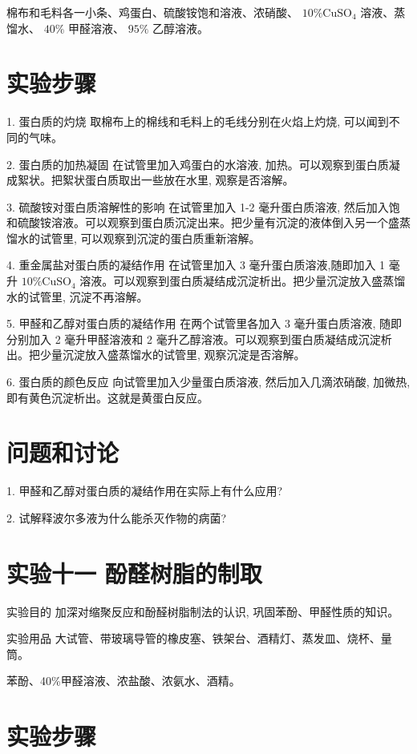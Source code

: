 \documentclass[10pt]{article}
\begin{document}
棉布和毛料各一小条、鸡蛋白、硫酸铵饱和溶液、浓硝酸、 \({10}\% {\mathrm{{CuSO}}}_{4}\) 溶液、蒸馏水、 \({40}\%\) 甲醛溶液、 \({95}\%\) 乙醇溶液。

\section*{实验步骤}

1. 蛋白质的灼烧 取棉布上的棉线和毛料上的毛线分别在火焰上灼烧, 可以闻到不同的气味。

2. 蛋白质的加热凝固 在试管里加入鸡蛋白的水溶液, 加热。可以观察到蛋白质凝成絮状。把絮状蛋白质取出一些放在水里, 观察是否溶解。

3. 硫酸铵对蛋白质溶解性的影响 在试管里加入 1-2 毫升蛋白质溶液, 然后加入饱和硫酸铵溶液。可以观察到蛋白质沉淀出来。把少量有沉淀的液体倒入另一个盛蒸馏水的试管里, 可以观察到沉淀的蛋白质重新溶解。

4. 重金属盐对蛋白质的凝结作用 在试管里加入 3 毫升蛋白质溶液,随即加入 1 毫升 \({10}\% {\mathrm{{CuSO}}}_{4}\) 溶液。可以观察到蛋白质凝结成沉淀析出。把少量沉淀放入盛蒸馏水的试管里, 沉淀不再溶解。

5. 甲醛和乙醇对蛋白质的凝结作用 在两个试管里各加入 3 毫升蛋白质溶液, 随即分别加入 2 毫升甲醛溶液和 2 毫升乙醇溶液。可以观察到蛋白质凝结成沉淀析出。把少量沉淀放入盛蒸馏水的试管里, 观察沉淀是否溶解。

6. 蛋白质的颜色反应 向试管里加入少量蛋白质溶液, 然后加入几滴浓硝酸, 加微热, 即有黄色沉淀析出。这就是黄蛋白反应。

\section*{问题和讨论}

1. 甲醛和乙醇对蛋白质的凝结作用在实际上有什么应用?

2. 试解释波尔多液为什么能杀灭作物的病菌?

\section*{实验十一 酚醛树脂的制取}

实验目的 加深对缩聚反应和酚醛树脂制法的认识, 巩固苯酚、甲醛性质的知识。

实验用品 大试管、带玻璃导管的橡皮塞、铁架台、酒精灯、蒸发皿、烧杯、量筒。

苯酚、40\%甲醛溶液、浓盐酸、浓氨水、酒精。

\section*{实验步骤}
\end{document}
